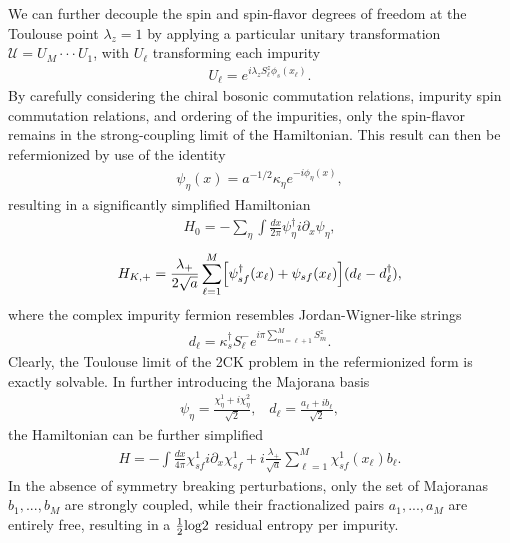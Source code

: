 \documentclass[aps,prb,twocolumn,superscriptaddress]{revtex4-1}
\begin{document}
We can further decouple the spin and spin-flavor degrees of freedom at the Toulouse point $\lambda_{z}=1$ by applying a particular unitary transformation $\mathcal{U}=U_{M}\cdot\cdot\cdot U_{1}$, with $U_{\ell}$ transforming each impurity 
\begin{eqnarray}
U_{\ell}=e^{i\lambda_{z}S_{\ell}^{z}\phi_{s}(x_{\ell})}. \label{eqn:unitary_trnsfrm}
\end{eqnarray}
By carefully considering the chiral bosonic commutation relations, impurity spin commutation relations, and ordering of the impurities, only the spin-flavor remains in the strong-coupling limit of the Hamiltonian. This result can then be refermionized by use of the identity
\begin{eqnarray}
\psi_{\eta}(x)=a^{-1/2}\kappa_{\eta}e^{-i\phi_{\eta}(x)}, \label{eqn:refermionized_identity}
\end{eqnarray}
resulting in a significantly simplified Hamiltonian 
\begin{eqnarray}
H_{0}=-\sum_{\eta}\int\frac{dx}{2\pi}\psi_{\eta}^{\dagger}i\partial_{x}\psi_{\eta}, \label{eqn:H_refermionize_0}
\end{eqnarray}
\begin{eqnarray}
H_{K,+}=\frac{\lambda_{+}}{2\sqrt{a}}\sum_{\ell=1}^{M}\Bigl[\psi_{sf}^{\dagger}(x_{\ell})+\psi_{sf}(x_{\ell})\Bigr](d_{\ell}-d_{\ell}^{\dagger}),  \label{eqn:H_refermionize_Kplus}
\end{eqnarray}
where the complex impurity fermion resembles Jordan-Wigner-like strings
\begin{eqnarray}
d_{\ell}=\kappa_{s}^{\dagger}S_{\ell}^{-}e^{i\pi\sum_{m=\ell+1}^{M}S_{m}^{z}}.  \label{eqn:impurity_fermion}
\end{eqnarray}
Clearly, the Toulouse limit of the 2CK problem in the refermionized form is exactly solvable. In further introducing the Majorana basis 
\begin{eqnarray}
\psi_{\eta}=\frac{\chi_{\eta}^{1}+i\chi_{\eta}^{2}}{\sqrt{2}},\;\;\;d_{\ell}=\frac{a_{\ell}+ib_{\ell}}{\sqrt{2}}, \label{eqn:majorana_basis}
\end{eqnarray}
the Hamiltonian can be further simplified 
\begin{eqnarray}
H=-\int\frac{dx}{4\pi}\chi_{sf}^{1}i\partial_{x}\chi_{sf}^{1}+i\frac{\lambda_{+}}{\sqrt{a}}\sum_{\ell=1}^{M}\chi_{sf}^{1}(x_{\ell})b_{\ell}. \label{eqn:H_majorana}
\end{eqnarray}
In the absence of symmetry breaking perturbations, only the set of Majoranas $b_{1},...,b_{M}$ are strongly coupled, while their fractionalized pairs $a_{1},...,a_{M}$ are entirely free, resulting in a $\frac{1}{2}\textup{log}2$ residual entropy per impurity. 
\end{document}
